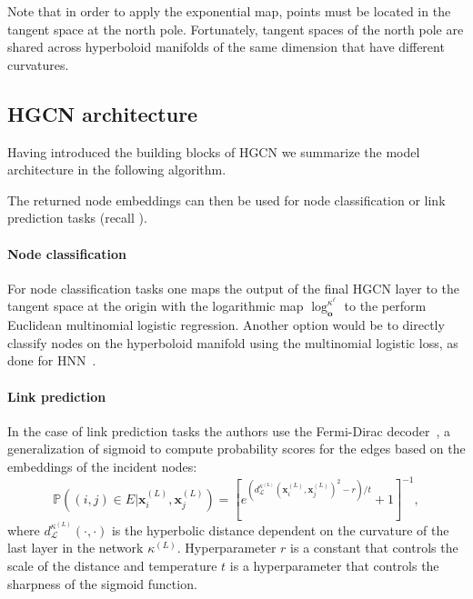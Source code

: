 Note that in order to apply the exponential map, points must be located in the tangent space at the north pole. Fortunately, tangent spaces of the north pole are shared across hyperboloid manifolds of the same dimension that have different curvatures.

\subsection{HGCN architecture}
Having introduced the building blocks of HGCN we summarize the model architecture in the following algorithm.


The returned node embeddings can then be used for node classification or link prediction tasks (recall ).

\paragraph{Node classification}
For node classification tasks one maps the output of the final HGCN layer to the tangent space at the origin with the logarithmic map $\log_\mathbf{o}^{\kappa^\ell}$ to the perform Euclidean multinomial logistic regression. Another option would be to directly classify nodes on the hyperboloid manifold using the multinomial logistic loss, as done for HNN~\cite{ganea2018HNN}.

\paragraph{Link prediction}\label{sec:linkPredictionHGCN}
In the case of link prediction tasks the authors use the Fermi-Dirac decoder~\cite{Krioukov2010HyperbolicGeometryComplexNetworks}\cite{nickel2017poincare}, a generalization of sigmoid to compute probability scores for the edges based on the embeddings of the incident nodes:
\begin{equation*}
    \mathbb{P}\left((i, j) \in E|\mathbf{x}_i^{(L)}, \mathbf{x}_j^{(L)}\right) = \left[e^{(d^{\kappa^{(L)}}_{\mathcal{L}}(\mathbf{x}^{(L)}_i, \mathbf{x}^{(L)}_j)^2-r)/t} + 1\right]^{-1},
\end{equation*}
where $d^{\kappa^{(L)}}_{\mathcal{L}}(\cdot, \cdot)$ is the hyperbolic distance dependent on the curvature of the last layer in the network $\kappa^{(L)}$. Hyperparameter $r$ is a constant that controls the scale of the distance and temperature $t$ is a hyperparameter that controls the sharpness of the sigmoid function.

